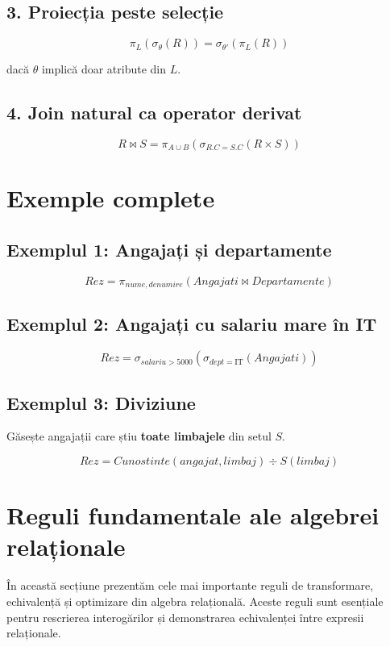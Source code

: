 \documentclass[12pt,a4paper]{article}
\begin{document}
\subsection{3. Proiecția peste selecție}


\[
\pi_L(\sigma_{\theta}(R)) = \sigma_{\theta'}(\pi_L(R))
\]


dacă $\theta$ implică doar atribute din $L$.

\subsection{4. Join natural ca operator derivat}


\[
R \bowtie S = \pi_{A \cup B}(\sigma_{R.C = S.C}(R \times S))
\]



\section{Exemple complete}

\subsection{Exemplul 1: Angajați și departamente}


\[
Rez = \pi_{nume, denumire}(Angajati \bowtie Departamente)
\]



\subsection{Exemplul 2: Angajați cu salariu mare în IT}


\[
Rez = \sigma_{salariu > 5000}(\sigma_{dept = \text{IT}}(Angajati))
\]



\subsection{Exemplul 3: Diviziune}
Găsește angajații care știu \textbf{toate limbajele} din setul $S$.



\[
Rez = Cunostinte(angajat, limbaj) \div S(limbaj)
\]


\section{Reguli fundamentale ale algebrei relaționale}

În această secțiune prezentăm cele mai importante reguli de transformare,
echivalență și optimizare din algebra relațională. Aceste reguli sunt
esențiale pentru rescrierea interogărilor și demonstrarea echivalenței
între expresii relaționale.
\end{document}
